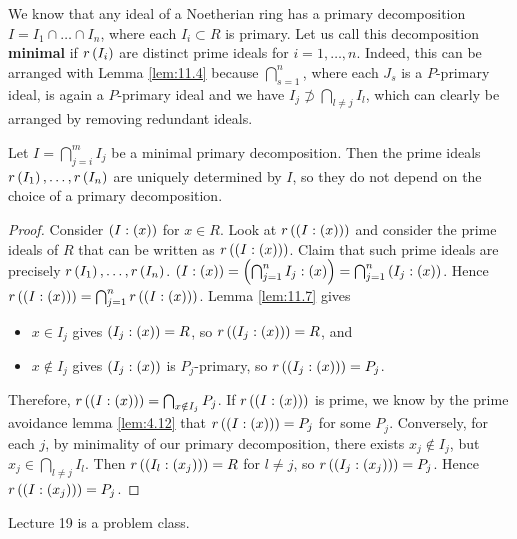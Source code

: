 We know that any ideal of a Noetherian ring has a primary decomposition $ I = I_1 \cap \dots \cap I_n $, where each $ I_i \subset R $ is primary. Let us call this decomposition \textbf{minimal} if $ r\left( I_i \right) $ are distinct prime ideals for $ i = 1, \dots, n $. Indeed, this can be arranged with Lemma \ref{lem:11.4} because $ \bigcap_{s = 1}^n $, where each $ J_s $ is a $ P $-primary ideal, is again a $ P $-primary ideal and we have $ I_j \not\supset \bigcap_{l \ne j} I_l $, which can clearly be arranged by removing redundant ideals.

\begin{theorem}
Let $ I = \bigcap_{j = i}^m I_j $ be a minimal primary decomposition. Then the prime ideals $ r\left( I_1 \right), \dots, r\left( I_n \right) $ are uniquely determined by $ I $, so they do not depend on the choice of a primary decomposition.
\end{theorem}

\begin{proof}
Consider $ \left( I : \left( x \right) \right) $ for $ x \in R $. Look at $ r\left( \left( I : \left( x \right) \right) \right) $ and consider the prime ideals of $ R $ that can be written as $ r\left( \left( I : \left( x \right) \right) \right) $. Claim that such prime ideals are precisely $ r\left( I_1 \right), \dots, r\left( I_n \right) $. $ \left( I : \left( x \right) \right) = \left( \bigcap_{j = 1}^n I_j : \left( x \right) \right) = \bigcap_{j = 1}^n \left( I_j : \left( x \right) \right) $. Hence $ r\left( \left( I : \left( x \right) \right) \right) = \bigcap_{j = 1}^n r\left( \left( I : \left( x \right) \right) \right) $. Lemma \ref{lem:11.7} gives
\begin{itemize}
\item $ x \in I_j $ gives $ \left( I_j : \left( x \right) \right) = R $, so $ r\left( \left( I_j : \left( x \right) \right) \right) = R $, and
\item $ x \notin I_j $ gives $ \left( I_j : \left( x \right) \right) $ is $ P_j $-primary, so $ r\left( \left( I_j : \left( x \right) \right) \right) = P_j $.
\end{itemize}
Therefore, $ r\left( \left( I : \left( x \right) \right) \right) = \bigcap_{x \notin I_j} P_j $. If $ r\left( \left( I : \left( x \right) \right) \right) $ is prime, we know by the prime avoidance lemma \ref{lem:4.12} that $ r\left( \left( I : \left( x \right) \right) \right) = P_j $ for some $ P_j $. Conversely, for each $ j $, by minimality of our primary decomposition, there exists $ x_j \notin I_j $, but $ x_j \in \bigcap_{l \ne j} I_l $. Then $ r\left( \left( I_l : \left( x_j \right) \right) \right) = R $ for $ l \ne j $, so $ r\left( \left( I_j : \left( x_j \right) \right) \right) = P_j $. Hence $ r\left( \left( I : \left( x_j \right) \right) \right) = P_j $.
\end{proof}


Lecture 19 is a problem class.


